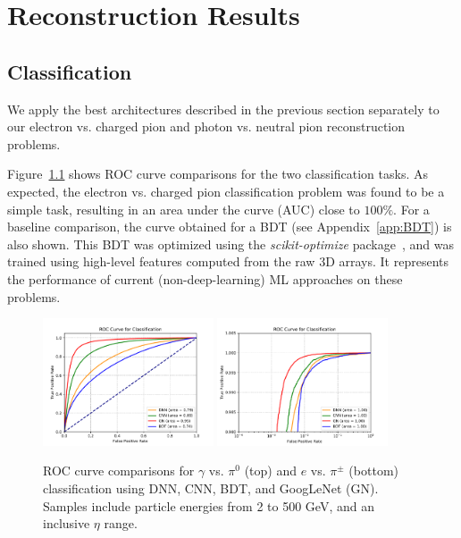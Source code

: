 \chapter{Reconstruction Results}

\section{Classification}

We apply the best architectures described in the previous section separately to our electron vs. charged pion and photon vs. neutral pion reconstruction problems.

Figure~\ref{fig:architectures_ROC_comparisons} shows ROC curve comparisons for the two classification tasks. As expected, the electron vs. charged pion classification problem was found to be a simple task, resulting in an area under the curve (AUC) close to $100\%$. For a baseline comparison, the curve obtained for a BDT (see Appendix~\ref{app:BDT}) is also shown. This BDT was optimized using the {\it scikit-optimize} package~\cite{skopt}, and was trained using high-level features computed from the raw 3D arrays. It represents the performance of current (non-deep-learning) ML approaches on these problems.

\begin{figure}[htbp]
\centering
\includegraphics[width=0.45\textwidth]{Images/Calo/architectures_ROC_comparison_gamma_pi0_long.pdf}
\includegraphics[width=0.45\textwidth]{Images/Calo/architectures_ROC_comparison_ele_chpi_xlog.pdf}
\caption{ROC curve comparisons for $\gamma$ vs. $\pi^0$ (top) and $e$ vs. $\pi^\pm$ (bottom) classification using DNN, CNN, BDT, and GoogLeNet (GN). Samples include particle energies from 2 to 500 GeV, and an inclusive $\eta$ range.}
\label{fig:architectures_ROC_comparisons}
\end{figure}

